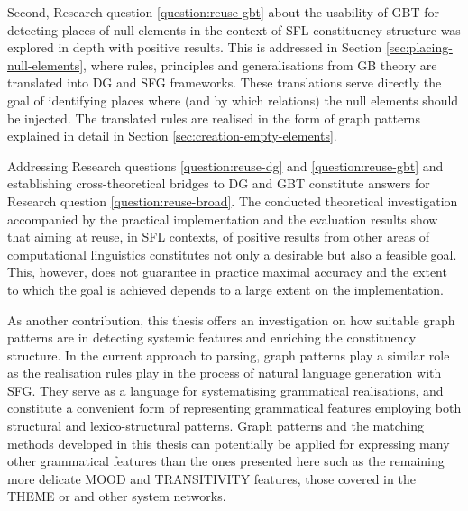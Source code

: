     Second, Research question \ref{question:reuse-gbt} about the usability of GBT for detecting places of null elements in the context of SFL constituency structure was explored in depth with positive results. This is addressed in Section \ref{sec:placing-null-elements}, where rules, principles and generalisations from GB theory are translated into DG and SFG frameworks. These translations serve directly the goal of identifying places where (and by which relations) the null elements should be injected. The translated rules are realised in the form of graph patterns explained in detail in Section \ref{sec:creation-empty-elements}.

    Addressing Research questions \ref{question:reuse-dg} and \ref{question:reuse-gbt}
    and establishing cross-theoretical bridges to DG and GBT constitute answers for Research question \ref{question:reuse-broad}. The conducted theoretical investigation accompanied by the practical implementation and the evaluation results show that aiming at reuse, in SFL contexts, of positive results from other areas of computational linguistics constitutes not only a desirable but also a feasible goal. This, however, does not guarantee in practice maximal accuracy and the extent to which the goal is achieved depends to a large extent on the implementation. 
    
    As another contribution, this thesis offers an investigation on how suitable graph patterns are in detecting systemic features and enriching the constituency structure. In the current approach to parsing, graph patterns play a similar role as the realisation rules play in the process of natural language generation with SFG. They serve as a language for systematising grammatical realisations, and constitute a convenient form of representing grammatical features employing both structural and lexico-structural patterns. Graph patterns and the matching methods developed in this thesis can potentially be applied for expressing many other grammatical features than the ones presented here such as the remaining more delicate MOOD and TRANSITIVITY features, those covered in the THEME or and other system networks.

